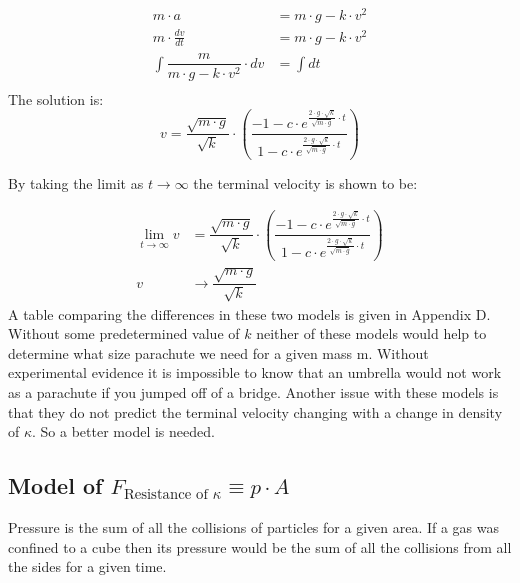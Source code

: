 \documentclass[12pt,letterpaper,final]{article}
\begin{document}
\begin{equation}
\begin{align}
						m \cdot a &= m \cdot g - k \cdot v^{2}\\
m\cdot \tfrac{dv}{dt} &= m \cdot g - k \cdot v^{2}\\
\int\dfrac{m}{m \cdot g - k \cdot v^{2}}\cdot dv &= \int dt\\
\end{align}
\end{equation}
The solution is:
\begin{equation}
v = \dfrac{\sqrt{m \cdot g}}{\sqrt{k}}\cdot \left(\dfrac{-1 - c \cdot\textit{e}^{\tfrac{2\cdot g \cdot\sqrt{k}}{\sqrt{m \cdot g}}\cdot t}}{1 - c \cdot\textit{e}^{\tfrac{2\cdot g \cdot\sqrt{k}}{\sqrt{m \cdot g}}\cdot t}}\right)
\end{equation}

By taking the limit as $t \to \infty$ the terminal velocity is shown to be:

\begin{equation}
\begin{align}
\lim_{t \to \infty} v &= \dfrac{\sqrt{m \cdot g}}{\sqrt{k}}\cdot \left(\dfrac{-1 - c \cdot\textit{e}^{\tfrac{2\cdot g \cdot\sqrt{k}}{\sqrt{m \cdot g}}\cdot t}}{1 - c \cdot\textit{e}^{\tfrac{2\cdot g \cdot\sqrt{k}}{\sqrt{m \cdot g}}\cdot t}}\right)\\
v &\to \dfrac{\sqrt{m \cdot g}}{\sqrt{k}}
\end{align}
\end{equation}
A table comparing the differences in these two models is given in Appendix D. Without some predetermined value of $k$ neither of these models would help to determine what size parachute we need for a given mass m. Without experimental evidence it is impossible to know that an umbrella would not work as a parachute if you jumped off of a bridge. Another issue with these models is that they do not predict the terminal velocity changing with a change in density of $\kappa$. So a better model is needed.

\subsection{Model of $F_{\text{Resistance of }\kappa} \equiv p \cdot A$}
Pressure is the sum of all the collisions of particles for a given area. If a gas was confined to a cube then its pressure would be the sum of all the collisions from all the sides for a given time.\\
\end{document}
